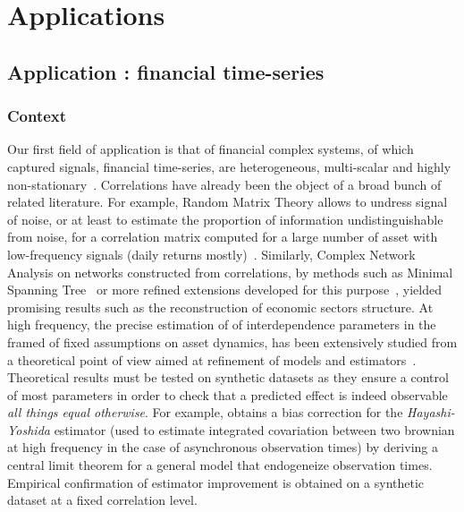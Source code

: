 \section{Applications}



\subsection{Application : financial time-series}


\subsubsection{Context}

Our first field of application is that of financial complex systems, of which captured signals, financial time-series, are heterogeneous, multi-scalar and highly non-stationary~\cite{mantegna2000introduction}. Correlations have already been the object of a broad bunch of related literature. For example, Random Matrix Theory allows to undress signal of noise, or at least to estimate the proportion of information undistinguishable from noise, for a correlation matrix computed for a large number of asset with low-frequency signals (daily returns mostly)~\cite{2009arXiv0910.1205B}. Similarly, Complex Network Analysis on networks constructed from correlations, by methods such as Minimal Spanning Tree~\cite{2001PhyA..299...16B} or more refined extensions developed for this purpose~\cite{tumminello2005tool}, yielded promising results such as the reconstruction of economic sectors structure. At high frequency, the precise estimation of of interdependence parameters in the framed of fixed assumptions on asset dynamics, has been extensively studied from a theoretical point of view aimed at refinement of models and estimators~\cite{barndorff2011multivariate}. Theoretical results must be tested on synthetic datasets as they ensure a control of most parameters in order to check that a predicted effect is indeed observable \emph{all things equal otherwise}. For example, \cite{potiron2015estimation} obtains a bias correction for the \emph{Hayashi-Yoshida} estimator (used to estimate integrated covariation between two brownian at high frequency in the case of asynchronous observation times) by deriving a central limit theorem for a general model that endogeneize observation times. Empirical confirmation of estimator improvement is obtained on a synthetic dataset at a fixed correlation level.

